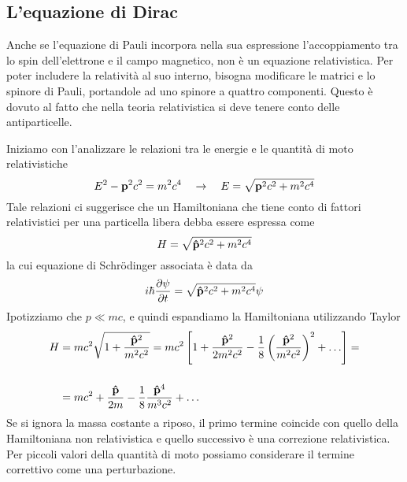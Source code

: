 \subsection{L'equazione di Dirac }

Anche se l'equazione di Pauli incorpora nella sua espressione l'accoppiamento tra lo spin dell'elettrone e il campo magnetico, non \`e un equazione relativistica. Per poter includere la relativit\`a al suo interno, bisogna modificare le matrici e lo spinore di Pauli, portandole ad uno spinore a quattro componenti. Questo \`e dovuto al fatto che nella teoria relativistica si deve tenere conto delle antiparticelle.

Iniziamo con l'analizzare le relazioni tra le energie e le quantit\`a di moto relativistiche
\begin{equation*}
	E^2 - \bold{p}^2c^2 = m^2c^4 \quad \rightarrow \quad E = \sqrt{\bold{p}^2c^2 + m^2 c^4}
\end{equation*}
Tale relazioni ci suggerisce che un Hamiltoniana che tiene conto di fattori relativistici per una particella libera debba essere espressa come
\begin{equation*}
	H = \sqrt{\bold{\hat{p}}^2c^2 + m^2 c^4}
\end{equation*}
la cui equazione di Schr\"odinger associata \`e data da
\begin{equation*}
	i \hbar \frac{\partial \psi }{\partial t} = \sqrt{\bold{\hat{p}}^2c^2 + m^2c^4} \psi
\end{equation*}
Ipotizziamo che $p \ll mc$, e quindi espandiamo la Hamiltoniana utilizzando Taylor
\begin{align*}
	H & = mc^2 \sqrt{1 + \frac{\bold{\hat{p}}^2}{m^2c^2}} = mc^2 \left [1 + \frac{\bold{\hat{p}}^2}{2m^2c^2} - \frac{1}{8} \left ( \frac{\bold{\hat{p}}^2}{m^2c^2}\right)^2 + \ldots \right] = \\[0.5cm]
	& = mc^2 + \frac{\bold{\hat{p}}}{2m} - \frac{1}{8}\frac{\bold{\hat{p}}^4}{m^3c^2} + \ldots
\end{align*}
Se si ignora la massa costante a riposo, il primo termine coincide con quello della Hamiltoniana non relativistica e quello successivo \`e una correzione relativistica. Per piccoli valori della quantit\`a di moto possiamo considerare il termine correttivo come una perturbazione.

